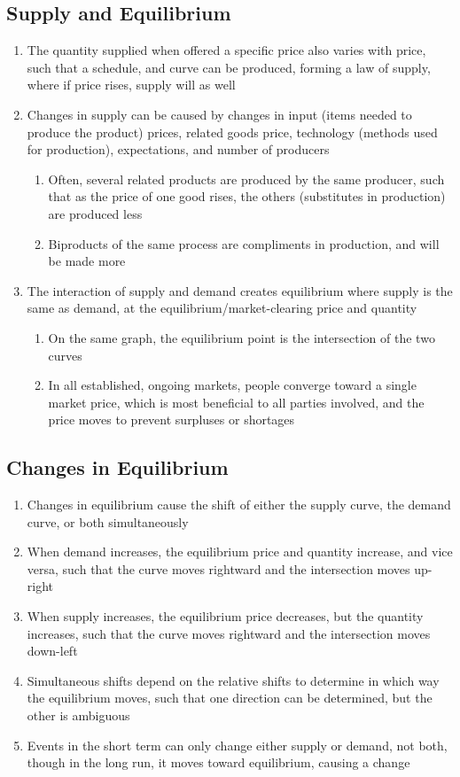 \documentclass[11 pt, twoside]{article}
\begin{document}
\subsection{Supply and Equilibrium}
\begin{enumerate}
\item The quantity supplied when offered a specific price also varies with price, such that a schedule, and curve can be produced, forming a law of supply, where if price rises, supply will as well
\item Changes in supply can be caused by changes in input (items needed to produce the product) prices, related goods price, technology (methods used for production), expectations, and number of producers
\begin{enumerate}
\item Often, several related products are produced by the same producer, such that as the price of one good rises, the others (substitutes in production) are produced less
\item Biproducts of the same process are compliments in production, and will be made more
\end{enumerate}
\item The interaction of supply and demand creates equilibrium where supply is the same as demand, at the equilibrium/market-clearing price and quantity
\begin{enumerate}
\item On the same graph, the equilibrium point is the intersection of the two curves
\item In all established, ongoing markets, people converge toward a single market price, which is most beneficial to all parties involved, and the price moves to prevent surpluses or shortages
\end{enumerate}
\end{enumerate}

\subsection{Changes in Equilibrium}
\begin{enumerate}
\item Changes in equilibrium cause the shift of either the supply curve, the demand curve, or both simultaneously
\item When demand increases, the equilibrium price and quantity increase, and vice versa, such that the curve moves rightward and the intersection moves up-right
\item When supply increases, the equilibrium price decreases, but the quantity increases, such that the curve moves rightward and the intersection moves down-left
\item Simultaneous shifts depend on the relative shifts to determine in which way the equilibrium moves, such that one direction can be determined, but the other is ambiguous
\item Events in the short term can only change either supply or demand, not both, though in the long run, it moves toward equilibrium, causing a change
\end{enumerate}
\end{document}
